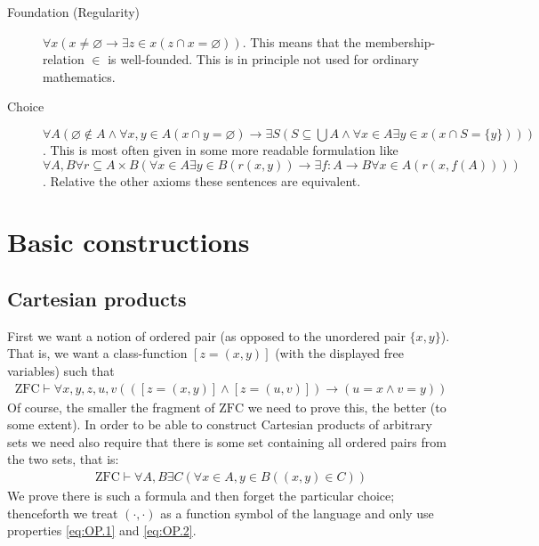 \documentclass{scrartcl}
\theoremstyle{definition}
\theoremstyle{plain}
\theoremstyle{remark}
\newcommand{\ZFC}{\ensuremath{\mathrm{ZFC}}}
\newcommand{\limp}{\rightarrow}
\begin{document}
\begin{description}
\item[Foundation (Regularity)] $\forall x (x \not= \varnothing \limp \exists z \in x (z \cap x = \varnothing))$. This means that the membership-relation $\in$ is well-founded. This is in principle not used for ordinary mathematics.
\item[Choice] $\forall A (\varnothing \not\in A \land \forall x, y \in A (x \cap y = \varnothing) \limp \exists S (S \subseteq \bigcup A \land \forall x \in A \exists y \in x (x \cap S = \{y\})))$. This is most often given in some more readable formulation like $\forall A, B \forall r \subseteq A \times B (\forall x \in A \exists y \in B (r(x,y)) \limp \exists f : A \longrightarrow B \forall x \in A (r(x,f(A))))$. Relative the other axioms these sentences are equivalent.
\end{description}

\section{Basic constructions}
\label{sec:basic}

\subsection{Cartesian products}
\label{subsec:prod}

First we want a notion of ordered pair (as opposed to the unordered pair $\{x,y\}$). That is, we want a class-function $[z = (x,y)]$ (with the displayed free variables) such that
\begin{align}
  \ZFC \vdash \forall x, y, z, u, v (([z = (x,y)] \land [z = (u,v)]) \limp (u = x \land v = y))\label{eq:OP.1}
\end{align}
Of course, the smaller the fragment of $\ZFC$ we need to prove this, the better (to some extent). In order to be able to construct Cartesian products of arbitrary sets we need also require that there is some set containing all ordered pairs from the two sets, that is:
\begin{align}
  \ZFC \vdash \forall A, B \exists C (\forall x \in A, y \in B ((x,y) \in C))\label{eq:OP.2}
\end{align}
We prove there is such a formula and then forget the particular choice; thenceforth we treat $(\cdot,\cdot)$ as a function symbol of the language and only use properties \eqref{eq:OP.1} and \eqref{eq:OP.2}.
\end{document}
